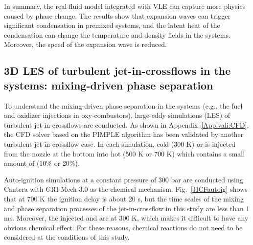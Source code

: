In summary, the real fluid model integrated with VLE can capture more physics caused by phase change. %
The results show that expansion waves can trigger significant condensation in premixed  systems, and the latent heat of the condensation can change the temperature and density fields in the systems. Moreover, the speed of the expansion wave is reduced.

\subsection{3D LES of turbulent jet-in-crossflows in the  systems: mixing-driven phase separation}
\label{sec:results:JICF}
To understand the mixing-driven phase separation in the  systems (e.g., the fuel and oxidizer injections in  oxy-combustors), large-eddy simulations (LES) of turbulent jet-in-crossflows are conducted. As shown in Appendix~\ref{App:vali:CFD}, the CFD solver based on the PIMPLE algorithm has been validated by another turbulent jet-in-crossflow case. %
In each simulation, cold (300 K)  or  is injected from the nozzle at the bottom into hot (500 K or 700 K)  which contains a small amount of  (10\% or 20\%). %

Auto-ignition simulations at a constant pressure of 300 bar are conducted using Cantera \cite{goodwin2009cantera} with GRI-Mech 3.0 \cite{smith1999gri} as the chemical mechanism. Fig.~\ref{JICFautoig} shows that at 700 K the ignition delay is about 20 s, but the time scales of the mixing and phase separation processes of the jet-in-crossflow in this study are less than 1 ms. Moreover, the injected  and  are at 300 K, which makes it difficult to have any obvious chemical effect. For these reasons, chemical reactions do not need to be considered at the conditions of this study.

